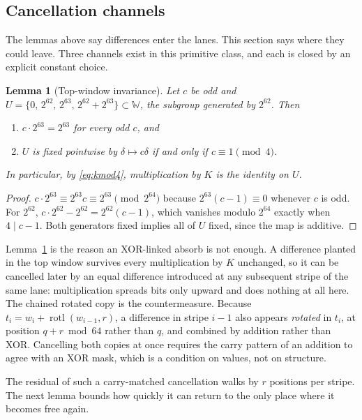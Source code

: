 \documentclass[10pt,a4paper]{article}
\newtheorem{lemma}{Lemma}
\theoremstyle{remark}
\newcommand{\rotl}{\operatorname{rotl}}
\newcommand{\W}{\mathbb{W}}
\begin{document}
\subsection{Cancellation channels}
\label{sec:channels}

The lemmas above say differences enter the lanes.  This section says where
they could leave.  Three channels exist in this primitive class, and each is
closed by an explicit constant choice.

\begin{lemma}[Top-window invariance]
\label{lem:top}
Let \(c\) be odd and \(U = \{0,\, 2^{62},\, 2^{63},\, 2^{62}+2^{63}\}
\subset \W\), the subgroup generated by \(2^{62}\).  Then
\begin{enumerate}
\item \(c \cdot 2^{63} = 2^{63}\) for every odd \(c\), and
\item \(U\) is fixed pointwise by \(\delta \mapsto c\delta\) if and only if
      \(c \equiv 1 \pmod 4\).
\end{enumerate}
In particular, by \eqref{eq:kmod4}, multiplication by \(K\) is the identity
on \(U\).
\end{lemma}

\begin{proof}
\(c \cdot 2^{63} \equiv 2^{63} c \equiv 2^{63} \pmod{2^{64}}\) because
\(2^{63}(c-1) \equiv 0\) whenever \(c\) is odd.  For \(2^{62}\),
\(c \cdot 2^{62} - 2^{62} = 2^{62}(c-1)\), which vanishes modulo \(2^{64}\)
exactly when \(4 \mid c-1\).  Both generators fixed implies all of \(U\)
fixed, since the map is additive.
\end{proof}

Lemma~\ref{lem:top} is the reason an XOR-linked absorb is not enough.  A
difference planted in the top window survives every multiplication by \(K\)
unchanged, so it can be cancelled later by an equal difference introduced at
any subsequent stripe of the same lane: multiplication spreads bits only
upward and does nothing at all here.  The chained rotated copy is the
countermeasure.  Because \(t_i = w_i + \rotl(w_{i-1},r)\), a difference in
stripe \(i-1\) also appears \emph{rotated} in \(t_i\), at position
\(q + r \bmod 64\) rather than \(q\), and combined by addition rather than
XOR.  Cancelling both copies at once requires the carry pattern of an
addition to agree with an XOR mask, which is a condition on values, not on
structure.

The residual of such a carry-matched cancellation walks by \(r\) positions
per stripe.  The next lemma bounds how quickly it can return to the only
place where it becomes free again.
\end{document}
